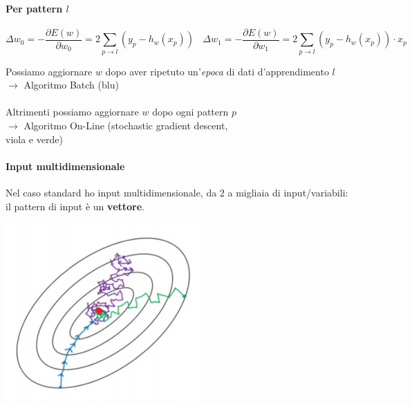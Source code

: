 \documentclass[10pt]{book}
\begin{document}
\paragraph{Per pattern $l$}
$$\Delta w_0 = -\frac{\partial E(w)}{\partial w_0} = 2\sum_{p\to l}(y_p - h_w(x_p))\:\:\:\:\Delta w_1 = -\frac{\partial E(w)}{\partial w_1} = 2\sum_{p\to l}(y_p - h_w(x_p))\cdot x_p$$
\begin{multicols}{2}
Possiamo aggiornare $w$ dopo aver ripetuto un'\textit{epoca} di dati d'apprendimento $l$\\$\rightarrow$ Algoritmo Batch (blu)\\\\
Altrimenti possiamo aggiornare $w$ dopo ogni pattern $p$\\$\rightarrow$ Algoritmo On-Line (stochastic gradient descent,\\viola e verde)
\paragraph{Input multidimensionale} Nel caso standard ho input multidimensionale, da 2 a migliaia di input/variabili: il pattern di input è un \textbf{vettore}.
\begin{center}
	\includegraphics[scale=0.75]{ml_patternl.png}
\end{center}
\end{multicols}
\end{document}
